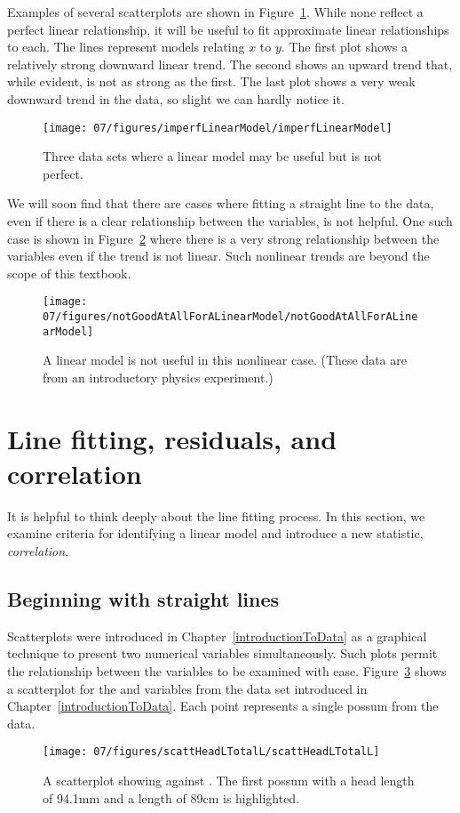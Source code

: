 Examples of several scatterplots are shown in Figure~\ref{imperfLinearModel}. While none reflect a perfect linear relationship, it will be useful to fit approximate linear relationships to each. The lines represent models relating $x$ to $y$. The first plot shows a relatively strong downward linear trend. The second shows an upward trend that, while evident, is not as strong as the first. The last plot shows a very weak downward trend in the data, so slight we can hardly notice it.
\begin{figure}
   \centering
   \texttt{[image: 07/figures/imperfLinearModel/imperfLinearModel]}
   \caption{Three data sets where a linear model may be useful but is not perfect.}
   \label{imperfLinearModel}
\end{figure}

We will soon find that there are cases where fitting a straight line to the data, even if there is a clear relationship between the variables, is not helpful. One such case is shown in Figure~\ref{notGoodAtAllForALinearModel} where there is a very strong relationship between the variables even if the trend is not linear. Such nonlinear trends are beyond the scope of this textbook.
\begin{figure}
   \centering
   \texttt{[image: 07/figures/notGoodAtAllForALinearModel/notGoodAtAllForALinearModel]}
   \caption{A linear model is not useful in this nonlinear case. (These data are from an introductory physics experiment.)}
   \label{notGoodAtAllForALinearModel}
\end{figure}


\section{Line fitting, residuals, and correlation}
\label{lineFittingResidualsCorrelation}

It is helpful to think deeply about the line fitting process. In this section, we examine criteria for identifying a linear model and introduce a new statistic, \emph{correlation}.

\subsection{Beginning with straight lines}

Scatterplots were introduced in Chapter~\ref{introductionToData} as a graphical technique to present two numerical variables simultaneously. Such plots permit the relationship between the variables to be examined with ease. Figure~\ref{scattHeadLTotalL} shows a scatterplot for the  and  variables from the  data set introduced in Chapter~\ref{introductionToData}. Each point represents a single possum from the data.
\begin{figure}
   \centering
   \texttt{[image: 07/figures/scattHeadLTotalL/scattHeadLTotalL]}
   \caption{A scatterplot showing  against . The first possum with a head length of 94.1mm and a length of 89cm is highlighted.}
   \label{scattHeadLTotalL}
\end{figure}

